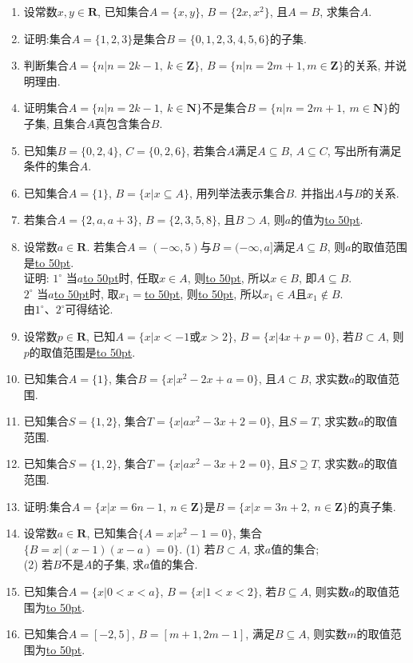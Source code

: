 \documentclass[10pt,a4paper]{article}
\newcommand{\blank}[1]{\underline{\hbox to #1pt{}}}
\begin{document}
\begin{enumerate}[1.]
\item 设常数$x,y\in \mathbf{R}$, 已知集合$A=\{x, y\}$, $B=\{2x, x^2\}$, 且$A=B$, 求集合$A$.
\item  证明:集合$A=\{1,2,3\}$是集合$B=\{0,1,2,3,4,5,6\}$的子集.
\item 判断集合$A=\{n|n=2k-1,\ k\in \mathbf{Z}\}$, $B=\{n|n=2m+1,m\in \mathbf{Z}\}$的关系, 并说明理由.
\item 证明集合$A=\{n|n=2k-1,\ k\in \mathbf{N}\}$不是集合$B=\{n|n=2m+1, \ m\in \mathbf{N}\}$的子集, 且集合$A$真包含集合$B$.
\item 已知集$B=\{0, 2, 4\}$, $C=\{0, 2, 6\}$, 若集合$A$满足$A\subseteq B$, $A\subseteq C$, 写出所有满足条件的集合$A$.
\item 已知集合$A=\{1\}$, $B=\{x|x\subseteq A\}$, 用列举法表示集合$B$. 并指出$A$与$B$的关系.
\item 若集合$A=\{2,a,a+3\}$, $B=\{2,3,5,8\}$, 且$B\supset A$, 则$a$的值为\blank{50}.
\item 设常数$a\in \mathbf{R}$. 若集合$A=(-\infty ,5)$与$B=(-\infty ,a]$满足$A\subseteq B$, 则$a$的取值范围是\blank{50}.\\
证明: $1^\circ$ 当$a$\blank{50}时, 任取$x\in A$, 则\blank{50}, 所以$x\in B$, 即$A\subseteq B$.\\ 
$2^\circ$ 当$a$\blank{50}时, 取$x_1=$\blank{50}, 则\blank{50}, 所以$x_1\in A$且$x_1\not \in B$.\\
由$1^\circ$、$2^\circ$可得结论.
\item 设常数$p\in\mathbf{R}$, 已知$A=\{x|x<-1$或$x>2\}$, $B=\{x|4x+p=0\}$, 若$B\subset A$, 则$p$的取值范围是\blank{50}.
\item 已知集合$A=\{1\}$, 集合$B=\{x|x^2-2x+a=0\}$, 且$A\subset B$, 求实数$a$的取值范围.
\item 已知集合$S=\{1, 2\}$, 集合$T=\{x|ax^2-3x+2=0\}$, 且$S=T$, 求实数$a$的取值范围.
\item 已知集合$S=\{1, 2\}$, 集合$T=\{x|ax^2-3x+2=0\}$, 且$S\supseteq T$, 求实数$a$的取值范围.
\item 证明:集合$A=\{x|x=6n-1, \ n\in\mathbf{Z}\}$是$B=\{x|x=3n+2, \ n\in\mathbf{Z}\}$的真子集.
\item 设常数$a\in \mathbf{R}$, 已知集合$\{A=x|x^2-1=0\}$, 集合$\{B=x|(x-1)(x-a)=0\}$.
(1) 若$B\subset A$, 求$a$值的集合;\\
(2) 若$B$不是$A$的子集, 求$a$值的集合.
\item 已知集合$A=\{x|0<x<a\}$, $B=\{x|1<x<2\}$, 若$B\subseteq A$, 则实数$a$的取值范围为\blank{50}.
\item 已知集合$A=[-2,5]$, $B=[m+1,2m-1]$, 满足$B\subseteq A$, 则实数$m$的取值范围为\blank{50}.

\end{enumerate}
\end{document}
